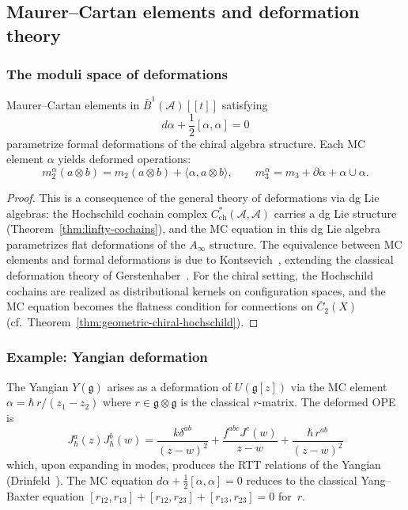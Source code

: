 \subsection{Maurer--Cartan elements and deformation theory}

\subsubsection{The moduli space of deformations}

\begin{theorem}[Maurer--Cartan = deformations {\cite{Kontsevich03,Ger63}}; \ClaimStatusProvedElsewhere]\label{thm:genus-graded-mc}
Maurer--Cartan elements in $\bar{B}^1(\mathcal{A})[[t]]$ satisfying
\[d\alpha + \frac{1}{2}[\alpha, \alpha] = 0\]
parametrize formal deformations of the chiral algebra structure.
Each MC element $\alpha$ yields deformed operations:
\[m_2^\alpha(a \otimes b) = m_2(a \otimes b) + \langle \alpha, a \otimes b \rangle, \qquad
m_3^\alpha = m_3 + \partial\alpha + \alpha \cup \alpha.\]
\end{theorem}

\begin{proof}
This is a consequence of the general theory of deformations via
dg Lie algebras: the Hochschild cochain complex
$C^*_{\mathrm{ch}}(\mathcal{A}, \mathcal{A})$ carries a dg Lie
structure (Theorem~\ref{thm:linfty-cochains}), and the MC equation
in this dg Lie algebra parametrizes flat deformations of the
$A_\infty$ structure.  The equivalence between MC elements and
formal deformations is due to Kontsevich~\cite{Kontsevich03},
extending the classical deformation theory of
Gerstenhaber~\cite{Ger63}.  For the chiral setting, the
Hochschild cochains are realized as distributional kernels on
configuration spaces, and the MC equation becomes the flatness
condition for connections on
$\overline{C}_2(X)$ (cf.\ Theorem~\ref{thm:geometric-chiral-hochschild}).
\end{proof}

\subsubsection{Example: Yangian deformation}

\begin{proposition}
\label{prop:yangian-from-deformation}
The Yangian $Y(\mathfrak{g})$ arises as a deformation of $U(\mathfrak{g}[z])$
via the MC element
$\alpha = \hbar\, r/(z_1 - z_2)$
where $r \in \mathfrak{g} \otimes \mathfrak{g}$ is the classical
$r$-matrix.  The deformed OPE is
\[J^a_\hbar(z)J^b_\hbar(w) = \frac{k\delta^{ab}}{(z-w)^2} + \frac{f^{abc}J^c(w)}{z-w} + \frac{\hbar\, r^{ab}}{(z-w)^2}\]
which, upon expanding in modes, produces the RTT relations
of the Yangian \textup{(}Drinfeld~\cite{Drinfeld85}\textup{)}.
The MC equation $d\alpha + \frac{1}{2}[\alpha, \alpha] = 0$
reduces to the classical Yang--Baxter equation
$[r_{12}, r_{13}] + [r_{12}, r_{23}] + [r_{13}, r_{23}] = 0$
for~$r$.
\end{proposition}

